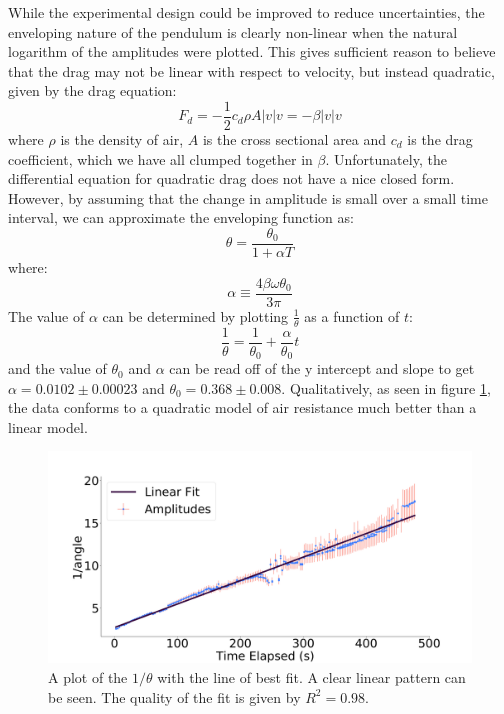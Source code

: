 \documentclass[%
 reprint,
 amsmath,amssymb
 aps,
]{revtex4-2}
\begin{document}
While the experimental design could be improved to reduce uncertainties, the enveloping nature of the pendulum is clearly non-linear when the natural logarithm of the amplitudes were plotted. This gives sufficient reason to believe that the drag may not be linear with respect to velocity, but instead quadratic, given by the drag equation:
\begin{equation}
    F_d = -\frac{1}{2}c_d\rho A|v|v = -\beta |v|v
    \label{eq:}
\end{equation}
where $\rho$ is the density of air, $A$ is the cross sectional area and $c_d$ is the drag coefficient, which we have all clumped together in $\beta$. Unfortunately, the differential equation for quadratic drag does not have a nice closed form. However, by assuming that the change in amplitude is small over a small time interval, we can approximate the enveloping function as\cite{Hauko}:
\begin{equation}
    \theta = \displaystyle \frac{\theta_0}{1+\alpha T}
    \label{eq:}
\end{equation}
where:
\begin{equation}
    \alpha \equiv \frac{4\beta \omega \theta_0}{3\pi}
    \label{eq:}
\end{equation}
The value of $\alpha$ can be determined by plotting $\frac{1}{\theta}$ as a function of $t$:
\begin{equation}
    \frac{1}{\theta} = \frac{1}{\theta_0}+\frac{\alpha}{\theta_0}t
    \label{eq:}
\end{equation}
and the value of $\theta_0$ and $\alpha$ can be read off of the y intercept and slope to get $\alpha = 0.0102 \pm 0.00023$ and $\theta_0=0.368 \pm 0.008$. Qualitatively, as seen in figure \ref{fig:quad-amplitude-vs-time}, the data conforms to a quadratic model of air resistance much better than a linear model. 
\begin{figure}[h]
    \includegraphics[width=\linewidth]{figures/quadratic-amplitude-vs-time-fitted.png}

    \caption{A plot of the $1/\theta$ with the line of best fit. A clear linear pattern can be seen. The quality of the fit is given by $R^2=0.98$.}
    \label{fig:quad-amplitude-vs-time}
\end{figure}
\end{document}
